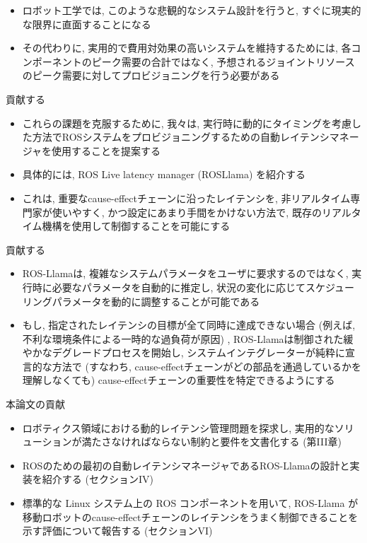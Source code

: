 \begin{frame}{}
    \begin{itemize}
        \item ロボット工学では, このような悲観的なシステム設計を行うと, すぐに現実的な限界に直面することになる
        \item その代わりに, 実用的で費用対効果の高いシステムを維持するためには, 各コンポーネントのピーク需要の合計ではなく, 予想されるジョイントリソースのピーク需要に対してプロビジョニングを行う必要がある
    \end{itemize}
\end{frame}

\begin{frame}{貢献する}
    \begin{itemize}
        \item これらの課題を克服するために, 我々は, 実行時に動的にタイミングを考慮した方法でROSシステムをプロビジョニングするための自動レイテンシマネージャを使用することを提案する
        \item 具体的には, ROS Live latency manager (ROSLlama) を紹介する
        \item これは, 重要なcause-effectチェーンに沿ったレイテンシを, 非リアルタイム専門家が使いやすく, かつ設定にあまり手間をかけない方法で, 既存のリアルタイム機構を使用して制御することを可能にする
    \end{itemize}
\end{frame}

\begin{frame}{貢献する}
    \begin{itemize}
        \item ROS-Llamaは, 複雑なシステムパラメータをユーザに要求するのではなく, 実行時に必要なパラメータを自動的に推定し, 状況の変化に応じてスケジューリングパラメータを動的に調整することが可能である
        \item もし, 指定されたレイテンシの目標が全て同時に達成できない場合 (例えば, 不利な環境条件による一時的な過負荷が原因) , ROS-Llamaは制御された緩やかなデグレードプロセスを開始し, システムインテグレーターが純粋に宣言的な方法で (すなわち, cause-effectチェーンがどの部品を通過しているかを理解しなくても) cause-effectチェーンの重要性を特定できるようにする
    \end{itemize}
\end{frame}

\begin{frame}{本論文の貢献}
    \begin{itemize}
        \item  ロボティクス領域における動的レイテンシ管理問題を探求し, 実用的なソリューションが満たさなければならない制約と要件を文書化する (第III章)

        \item  ROSのための最初の自動レイテンシマネージャであるROS-Llamaの設計と実装を紹介する (セクションIV)

        \item 標準的な Linux システム上の ROS コンポーネントを用いて, ROS-Llama が移動ロボットのcause-effectチェーンのレイテンシをうまく制御できることを示す評価について報告する (セクションVI)

    \end{itemize}
\end{frame}

